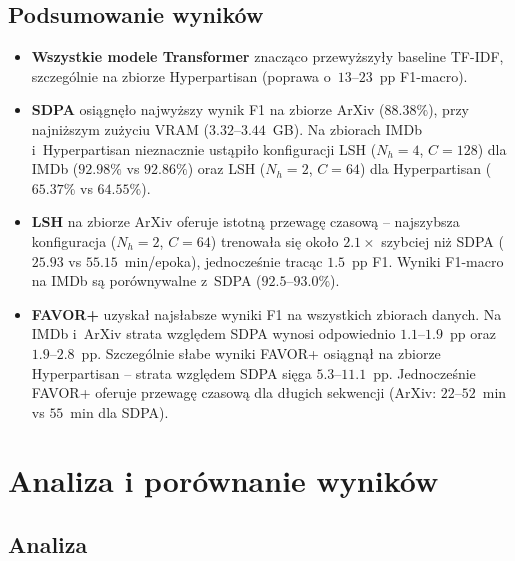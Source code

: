 \documentclass[a4paper,11pt,twoside]{report}
\theoremstyle{definition}
\begin{document}
\subsection{Podsumowanie wyników}

\begin{itemize}
    \item \textbf{Wszystkie modele Transformer} znacząco przewyższyły baseline TF-IDF, szczególnie na zbiorze Hyperpartisan (poprawa o~$13$--$23$~pp F1-macro).
    
    \item \textbf{SDPA} osiągnęło najwyższy wynik F1 na zbiorze ArXiv ($88.38\%$), przy najniższym zużyciu VRAM ($3.32$--$3.44$~GB). Na zbiorach IMDb i~Hyperpartisan nieznacznie ustąpiło konfiguracji LSH ($N_h{=}4$, $C{=}128$) dla IMDb ($92.98\%$ vs $92.86\%$) oraz LSH ($N_h{=}2$, $C{=}64$) dla Hyperpartisan ($65.37\%$ vs $64.55\%$).
    
    \item \textbf{LSH} na zbiorze ArXiv oferuje istotną przewagę czasową -- najszybsza konfiguracja ($N_h{=}2$, $C{=}64$) trenowała się około $2.1\times$ szybciej niż SDPA ($25.93$ vs $55.15$~min/epoka), jednocześnie tracąc $1.5$~pp F1. Wyniki F1-macro na IMDb są porównywalne z~SDPA ($92.5$--$93.0\%$).
    
    \item \textbf{FAVOR+} uzyskał najsłabsze wyniki F1 na wszystkich zbiorach danych. Na IMDb i~ArXiv strata względem SDPA wynosi odpowiednio $1.1$--$1.9$~pp oraz $1.9$--$2.8$~pp. Szczególnie słabe wyniki FAVOR+ osiągnął na zbiorze Hyperpartisan -- strata względem SDPA sięga $5.3$--$11.1$~pp. Jednocześnie FAVOR+ oferuje przewagę czasową dla długich sekwencji (ArXiv: $22$--$52$~min vs $55$~min dla SDPA).
    
\end{itemize}



\section{Analiza i porównanie wyników}\label{sec:analysis}
\subsection{Analiza}
\end{document}
